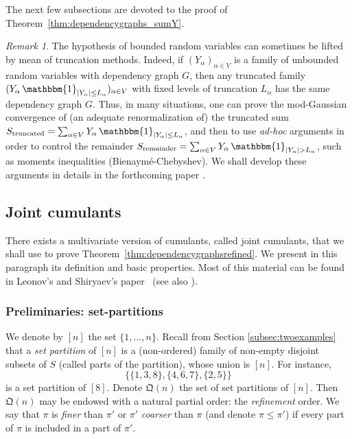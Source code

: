 \documentclass[12pt,a4paper,reqno]{amsart}
\theoremstyle{remark}
\newtheorem{remark}[lemma]{Remark}
\newcommand{\qym}{\mathfrak{Q}}
\begin{document}
The next few subsections are devoted to the proof of Theorem~\ref{thm:dependencygraphs_sumY}.
\medskip

\begin{remark}
The hypothesis of bounded random variables can sometimes be lifted by mean of truncation methods. Indeed, if $(Y_{\alpha})_{\alpha \in V}$ is a family of unbounded random variables with dependency graph $G$, then any truncated family $(Y_{\alpha}\,\mathbbm{1}_{|Y_{\alpha}|\leq L_{\alpha}})_{\alpha \in V}$ with fixed levels of truncation $L_{\alpha}$ has the same dependency graph $G$. Thus, in many situations, one can prove the mod-Gaussian convergence of (an adequate renormalization of) the truncated sum $S_{\text{truncated}}=\sum_{\alpha \in V} Y_{\alpha}\,\mathbbm{1}_{|Y_{\alpha}| \leq L_{\alpha}}$, and then to use \emph{ad-hoc} arguments in order to control the remainder $S_{\text{remainder}}=\sum_{\alpha \in V} Y_{\alpha}\,\mathbbm{1}_{|Y_{\alpha}| > L_{\alpha}}$, such as moments inequalities (Bienaymé-Chebyshev). We shall develop these arguments in details in the forthcoming paper \cite{FMN14}.
\end{remark}
\bigskip



\subsection{Joint cumulants}
There exists a multivariate version of cumulants, called joint cumulants, that we shall use to prove Theorem~\ref{thm:dependencygraphsrefined}. We present in this paragraph its definition and basic properties. Most of this material can be found in Leonov's and Shiryaev's paper~\cite{LS59} (see also \cite[Proposition 6.16]{JLR00}).
\medskip

\subsubsection{Preliminaries: set-partitions}
We denote by $[n]$ the set $\{1,\dots,n\}$. Recall from Section \ref{subsec:twoexamples} that a {\em set partition} of $[n]$ is a (non-ordered) family of non-empty disjoint subsets of $S$ (called parts of the partition), whose union is $[n]$. For instance,
$$\{\{1,3,8\},\{4,6,7\},\{2,5\}\}$$
is a set partition of $[8]$. Denote $\qym(n)$ the set of set partitions of $[n]$. Then $\qym(n)$ may be endowed with a natural partial order: the {\em refinement} order. We say that $\pi$ is {\em finer} than $\pi'$ or $\pi'$ {\em coarser} than $\pi$ (and denote $\pi \leq \pi'$) if every part of $\pi$ is included in a part of $\pi'$.\medskip
\end{document}
